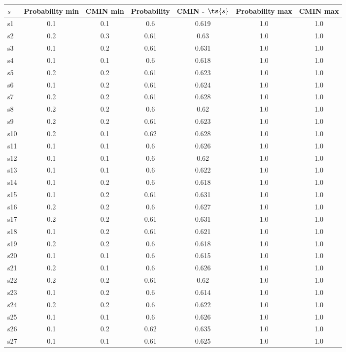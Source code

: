 \documentclass{article}
\begin{document}
\noindent\begin{tabular}{|l|c|c|c|c|c|c|}
\hline
$s$& Probability min & CMIN min & Probability & CMIN - $\ts{s}$ & Probability max & CMIN max\\
\hline
s1 &0.1 & 0.1 & 0.6 & 0.619 & 1.0 & 1.0\\
\hline
s2 &0.2 & 0.3 & 0.61 & 0.63 & 1.0 & 1.0\\
\hline
s3 &0.1 & 0.2 & 0.61 & 0.631 & 1.0 & 1.0\\
\hline
s4 &0.1 & 0.1 & 0.6 & 0.618 & 1.0 & 1.0\\
\hline
s5 &0.2 & 0.2 & 0.61 & 0.623 & 1.0 & 1.0\\
\hline
s6 &0.1 & 0.2 & 0.61 & 0.624 & 1.0 & 1.0\\
\hline
s7 &0.2 & 0.2 & 0.61 & 0.628 & 1.0 & 1.0\\
\hline
s8 &0.2 & 0.2 & 0.6 & 0.62 & 1.0 & 1.0\\
\hline
s9 &0.2 & 0.2 & 0.61 & 0.623 & 1.0 & 1.0\\
\hline
s10 &0.2 & 0.1 & 0.62 & 0.628 & 1.0 & 1.0\\
\hline
s11 &0.1 & 0.1 & 0.6 & 0.626 & 1.0 & 1.0\\
\hline
s12 &0.1 & 0.1 & 0.6 & 0.62 & 1.0 & 1.0\\
\hline
s13 &0.1 & 0.1 & 0.6 & 0.622 & 1.0 & 1.0\\
\hline
s14 &0.1 & 0.2 & 0.6 & 0.618 & 1.0 & 1.0\\
\hline
s15 &0.1 & 0.2 & 0.61 & 0.631 & 1.0 & 1.0\\
\hline
s16 &0.2 & 0.2 & 0.6 & 0.627 & 1.0 & 1.0\\
\hline
s17 &0.2 & 0.2 & 0.61 & 0.631 & 1.0 & 1.0\\
\hline
s18 &0.1 & 0.2 & 0.61 & 0.621 & 1.0 & 1.0\\
\hline
s19 &0.2 & 0.2 & 0.6 & 0.618 & 1.0 & 1.0\\
\hline
s20 &0.1 & 0.1 & 0.6 & 0.615 & 1.0 & 1.0\\
\hline
s21 &0.2 & 0.1 & 0.6 & 0.626 & 1.0 & 1.0\\
\hline
s22 &0.2 & 0.2 & 0.61 & 0.62 & 1.0 & 1.0\\
\hline
s23 &0.1 & 0.2 & 0.6 & 0.614 & 1.0 & 1.0\\
\hline
s24 &0.2 & 0.2 & 0.6 & 0.622 & 1.0 & 1.0\\
\hline
s25 &0.1 & 0.1 & 0.6 & 0.626 & 1.0 & 1.0\\
\hline
s26 &0.1 & 0.2 & 0.62 & 0.635 & 1.0 & 1.0\\
\hline
s27 &0.1 & 0.1 & 0.61 & 0.625 & 1.0 & 1.0\\

\end{tabular}
\end{document}
